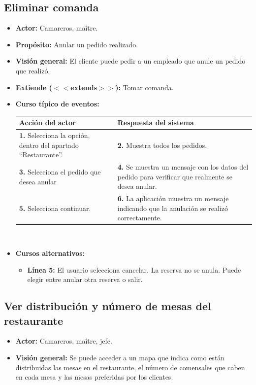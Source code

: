 \documentclass[spanish,a4paper,11pt, twoside]{report}	%
\begin{document}
		\subsection{Eliminar comanda}
			\begin{itemize}
			\item \textbf{Actor:} Camareros, maître.
			\item \textbf{Propósito: } Anular un pedido realizado.
			\item \textbf{Visión general:} El cliente puede pedir a un empleado que anule un pedido que realizó.
			\item \textbf{Extiende ($<<$extends$>>$):} Tomar comanda.
			\item \textbf{Curso típico de eventos:} 	\\
			\begin{tabular}{|p{6cm}||p{6cm}|}
				\hline
				\textbf{Acción del actor} & \textbf{Respuesta del sistema} \\ \hline \hline
				\textbf{1.} Selecciona la opción, dentro del apartado ``Restaurante''. & 
				\textbf{2.} Muestra todos los pedidos. \\ \hline
				\textbf{3.} Selecciona el pedido que desea anular	& 
				\textbf{4.} Se muestra un mensaje con los datos del pedido para verificar que realmente se desea anular. \\ \hline
				\textbf{5.} Selecciona continuar.	& 
				\textbf{6.} La aplicación muestra un mensaje indicando que la anulación se realizó correctamente. \\ \hline
			\end{tabular}
			\\
			\item \textbf{Cursos alternativos:} 
			\begin{itemize}
			\item  \textbf{Línea 5:} El usuario selecciona cancelar. La reserva no se anula. 
				Puede elegir entre anular otra reserva o salir.
			\end {itemize}
		\end {itemize}
		


			
		\subsection{Ver distribución y número de mesas del restaurante}
			\begin{itemize}
				\item \textbf{Actor:} Camareros, maître, jefe.
				\item \textbf{Visión general:} Se puede acceder a un mapa que indica como están
					distribuidas las mesas en el restaurante, el número de comensales que caben en
					cada mesa y las mesas preferidas por los clientes.
			\end {itemize}
\end{document}

